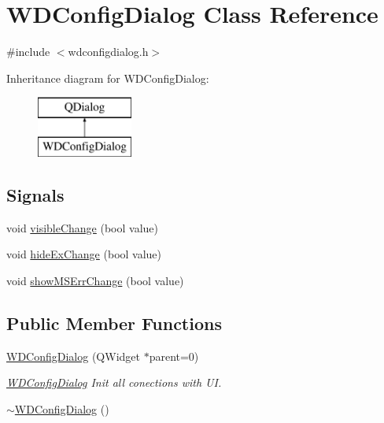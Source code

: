 \hypertarget{class_w_d_config_dialog}{}\section{W\+D\+Config\+Dialog Class Reference}
\label{class_w_d_config_dialog}


{\ttfamily \#include $<$wdconfigdialog.\+h$>$}

Inheritance diagram for W\+D\+Config\+Dialog\+:\begin{figure}[H]
\begin{center}
\leavevmode
\includegraphics[height=2.000000cm]{class_w_d_config_dialog}
\end{center}
\end{figure}
\subsection*{Signals}
\begin{DoxyCompactItemize}
\item 
void \hyperlink{class_w_d_config_dialog_a46e6c2574fc6de02a4219c24867c4c41}{visible\+Change} (bool value)
\item 
void \hyperlink{class_w_d_config_dialog_aa808e6dfb8b3489d9252f193f39ed22a}{hide\+Ex\+Change} (bool value)
\item 
void \hyperlink{class_w_d_config_dialog_a016142c07d15c313cbe71098e3c5b4df}{show\+M\+S\+Err\+Change} (bool value)
\end{DoxyCompactItemize}
\subsection*{Public Member Functions}
\begin{DoxyCompactItemize}
\item 
\hyperlink{class_w_d_config_dialog_adcd73104551e851520b62ae06734cb8e}{W\+D\+Config\+Dialog} (Q\+Widget $\ast$parent=0)
\begin{DoxyCompactList}\small\item\em \hyperlink{class_w_d_config_dialog}{W\+D\+Config\+Dialog} Init all conections with UI. \end{DoxyCompactList}\item 
\hyperlink{class_w_d_config_dialog_a28db62577a732e8bc26038a37123ed60}{$\sim$\+W\+D\+Config\+Dialog} ()
\end{DoxyCompactItemize}


